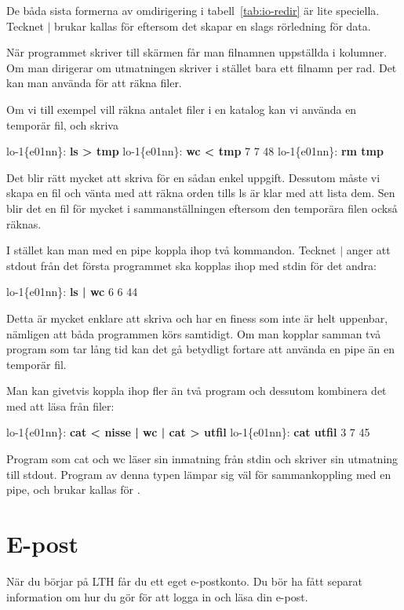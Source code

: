 \documentclass[a4paper,twocolumn]{book}
\begin{document}
De båda sista formerna av omdirigering i tabell~\ref{tab:io-redir} är lite
speciella. Tecknet $\mid$ brukar kallas för  eftersom det
skapar en slags rörledning för data.

När programmet  skriver till skärmen får man filnamnen
uppställda i kolumner. Om man dirigerar om utmatningen skriver
 i stället bara ett filnamn per rad. Det kan
man använda för att räkna filer.

Om vi till exempel vill räkna antalet filer i en katalog kan vi
använda en temporär fil, och skriva
\begin{example}
  lo-1\{e01nn\}: \textbf{ls > tmp}
  lo-1\{e01nn\}: \textbf{wc < tmp}
  7       7      48
  lo-1\{e01nn\}: \textbf{rm tmp}
\end{example}
Det blir rätt mycket att skriva för en sådan enkel uppgift.
Dessutom måste vi skapa en fil och vänta med att räkna orden tills ls
är klar med att lista dem. Sen blir det en fil för mycket i
sammanställningen eftersom den temporära filen också räknas.

I stället kan man med en pipe koppla ihop två kommandon. Tecknet
$\mid$ anger att stdout från det första programmet ska kopplas ihop
med stdin för det andra:
\begin{example}
  lo-1\{e01nn\}: \textbf{ls | wc}
  6       6      44
\end{example}
Detta är mycket enklare att skriva och har en finess som inte är helt
uppenbar, nämligen att båda programmen körs samtidigt. Om man kopplar
samman två program som tar lång tid kan det gå betydligt fortare att
använda en pipe än en temporär fil.

Man kan givetvis koppla ihop fler än två program och dessutom
kombinera det med att läsa från filer:
\begin{example}
  lo-1\{e01nn\}: \textbf{cat < nisse | wc | cat > utfil}
  lo-1\{e01nn\}: \textbf{cat utfil}
  3       7      45
\end{example}
Program som cat och wc läser sin inmatning från stdin och skriver sin
utmatning till stdout. Program av denna typen lämpar sig väl för
sammankoppling med en pipe, och brukar kallas för .
\section{E-post}

När du börjar på LTH får du ett eget e-postkonto. Du bör ha fått separat information om hur du gör för att logga in och läsa din e-post.
\end{document}
